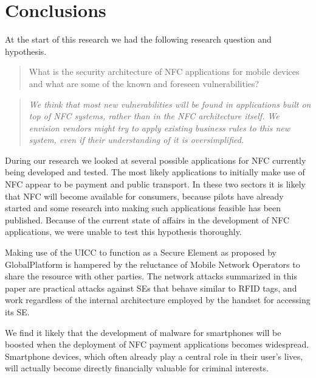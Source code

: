 \section{Conclusions}
\label{sec:conclusions}

At the start of this research we had the following research question and hypothesis. 

\begin{quote}
What is the security architecture of NFC applications for mobile devices and what are some of the known and foreseen vulnerabilities?
\end{quote}

\begin{quote}
\textit{We think that most new vulnerabilities will be found in applications built on top of NFC systems, rather than in the NFC architecture itself.
We envision vendors might try to apply existing business rules to this new system, even if their understanding of it is oversimplified.}
\end{quote}

During our research we looked at several possible applications for NFC currently being developed and tested.
The most likely applications to initially make use of NFC appear to be payment and public transport.
In these two sectors it is likely that NFC will become available for consumers, because pilots have already started and some research into making such applications feasible has been published.
Because of the current state of affairs in the development of NFC applications, we were unable to test this hypothesis thoroughly.

Making use of the UICC to function as a Secure Element as proposed by GlobalPlatform is hampered by the reluctance of Mobile Network Operators to share the resource with other parties.
The network attacks summarized in this paper are practical attacks against SEs that behave similar to RFID tags, and work regardless of the internal architecture employed by the handset for accessing its SE.

We find it likely that the development of malware for smartphones will be boosted when the deployment of NFC payment applications becomes widespread.
Smartphone devices, which often already play a central role in their user's lives, will actually become directly financially valuable for criminal interests.



